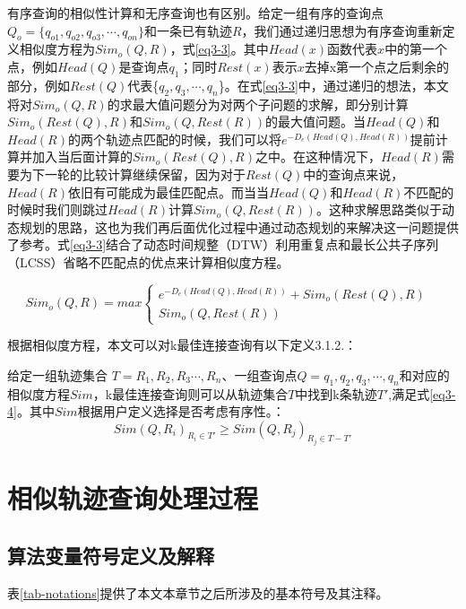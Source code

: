 有序查询的相似性计算和无序查询也有区别。给定一组有序的查询点$Q_{o} = \{q_{o1},q_{o2},q_{o3},\cdots, q_{on}\}$和一条已有轨迹$R$，我们通过递归思想为有序查询重新定义相似度方程为$Sim_{o}(Q,R)$，式\ref{eq3-3}。其中$Head(x)$函数代表$x$中的第一个点，例如$Head(Q)$是查询点$q_{1}$；同时$Rest(x)$表示$x$去掉x第一个点之后剩余的部分，例如$Rest(Q)$代表\{$q_{2},q_{3},\cdots, q_{n}$\}。在式\ref{eq3-3}中，通过递归的想法，本文将对$Sim_{o}(Q,R)$的求最大值问题分为对两个子问题的求解，即分别计算$Sim_{o}(Rest(Q),R)$和$Sim_{o}(Q,Rest(R))$的最大值问题。当$Head(Q)$和$Head(R)$的两个轨迹点匹配的时候，我们可以将$e^{-D_{e}(Head(Q), Head(R))}$提前计算并加入当后面计算的$Sim_{o}(Rest(Q),R)$之中。在这种情况下，$Head(R)$需要为下一轮的比较计算继续保留，因为对于$Rest(Q)$中的查询点来说，$Head(R)$依旧有可能成为最佳匹配点。而当当$Head(Q)$和$Head(R)$不匹配的时候时我们则跳过$Head(R)$计算$Sim_{o}(Q,Rest(R))$。这种求解思路类似于动态规划的思路，这也为我们再后面优化过程中通过动态规划的来解决这一问题提供了参考。式\ref{eq3-3}结合了动态时间规整（DTW）利用重复点和最长公共子序列（LCSS）省略不匹配点的优点来计算相似度方程。

\begin{equation} 
\label{eq3-3} 
Sim_{o}(Q,R)= max \left\{  
	\begin{array}{lr}  
    e^{-D_{e}(Head(Q), Head(R))} + Sim_{o}(Rest(Q),R) & \\
    Sim_{o}(Q,Rest(R)) &  
    \end{array}  
\right.  
\end{equation}  

根据相似度方程，本文可以对k最佳连接查询有以下定义3.1.2.：

\theoremstyle{definition}
\begin{definition}
	给定一组轨迹集合 $T = {R_{1}, R_{2}, R_{3} \cdots, R_{n}}$、一组查询点$Q = {q_{1},q_{2},q_{3},\cdots, q_{n}}$和对应的相似度方程$Sim$，k最佳连接查询则可以从轨迹集合$T$中找到k条轨迹$T'$,满足式\ref{eq3-4}。其中$Sim$根据用户定义选择是否考虑有序性。：
	\begin{equation}
		\label{eq3-4}
		Sim(Q,R_{i})_{R_{i} \in T'} \geq Sim(Q,R_{j})_{R_{j} \in T-T'}
	\end{equation}
\end{definition}

\section{相似轨迹查询处理过程}
\label{sec:query processing}

\subsection{算法变量符号定义及解释}
\label{subsec:algorithm-definition-explanation}
表\ref{tab-notations}提供了本文本章节之后所涉及的基本符号及其注释。

